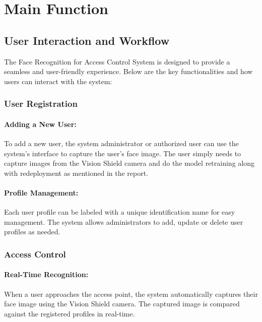%
%

\chapter{Main Function}

\section{User Interaction and Workflow}
The Face Recognition for Access Control System is designed to provide a seamless and user-friendly experience. Below are the key functionalities and how users can interact with the system:

\subsection{User Registration}

\subsubsection{Adding a New User:} 
To add a new user, the system administrator or authorized user can use the system’s interface to capture the user’s face image. The user simply needs to capture images from the Vision Shield camera and do the model retraining along with redeployment as mentioned in the report.

\subsubsection{Profile Management:} 
Each user profile can be labeled with a unique identification name for easy management. The system allows administrators to add, update or delete user profiles as needed.

\subsection{Access Control}

\subsubsection{Real-Time Recognition:} 
When a user approaches the access point, the system automatically captures their face image using the Vision Shield camera. The captured image is compared against the registered profiles in real-time.


